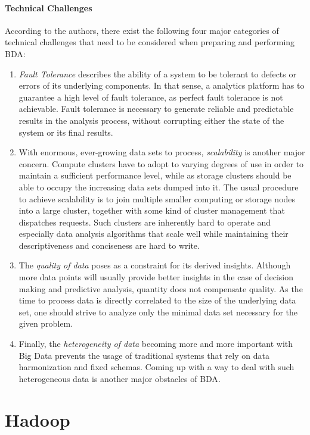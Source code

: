 \paragraph{Technical Challenges}
According to the authors, there exist the following four major categories of technical challenges that need to be considered when preparing and performing \ac{BDA}:

\begin{enumerate}
    \item \emph{Fault Tolerance} describes the ability of a system to be tolerant to defects or errors of its underlying components. In that sense, a analytics platform has to guarantee a high level of fault tolerance, as perfect fault tolerance is not achievable. Fault tolerance is necessary to generate reliable and predictable results in the analysis process, without corrupting either the state of the system or its final results.
    \item With enormous, ever-growing data sets to process, \emph{scalability} is another major concern. Compute clusters have to adopt to varying degrees of use in order to maintain a sufficient performance level, while as storage clusters should be able to occupy the increasing data sets dumped into it. The usual procedure to achieve scalability is to join multiple smaller computing or storage nodes into a large cluster, together with some kind of cluster management that dispatches requests. Such clusters are inherently hard to operate and especially data analysis algorithms that scale well while maintaining their descriptiveness and conciseness are hard to write.
    \item The \emph{quality of data} poses as a constraint for its derived insights. Although more data points will usually provide better insights in the case of decision making and predictive analysis, quantity does not compensate quality. As the time to process data is directly correlated to the size of the underlying data set, one should strive to analyze only the minimal data set necessary for the given problem.
    \item Finally, the \emph{heterogeneity of data} becoming more and more important with Big Data prevents the usage of traditional systems that rely on data harmonization and fixed schemas. Coming up with a way to deal with such heterogeneous data is another major obstacles of \ac{BDA}.
\end{enumerate}


\section{Hadoop}

